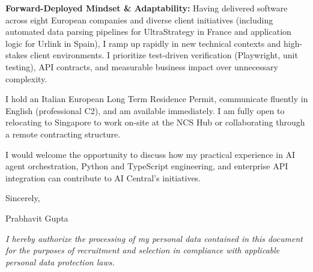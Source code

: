 \documentclass[10.5pt,a4paper]{article}
\begin{document}
\textbf{Forward-Deployed Mindset \& Adaptability:} Having delivered software across eight European companies and diverse client initiatives (including automated data parsing pipelines for UltraStrategy in France and application logic for Urlink in Spain), I ramp up rapidly in new technical contexts and high-stakes client environments. I prioritize test-driven verification (Playwright, unit testing), API contracts, and measurable business impact over unnecessary complexity.

I hold an Italian European Long Term Residence Permit, communicate fluently in English (professional C2), and am available immediately. I am fully open to relocating to Singapore to work on-site at the NCS Hub or collaborating through a remote contracting structure.

I would welcome the opportunity to discuss how my practical experience in AI agent orchestration, Python and TypeScript engineering, and enterprise API integration can contribute to AI Central's initiatives.

Sincerely,

Prabhavit Gupta

\vspace{0.6em}
{\footnotesize \textit{I hereby authorize the processing of my personal data contained in this document for the purposes of recruitment and selection in compliance with applicable personal data protection laws.}\par}
\end{document}
